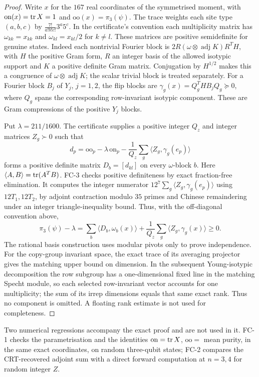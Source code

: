 \begin{proof}
Write $x$ for the $167$ real coordinates of the symmetrised moment, with
$\mathrm{on}(x)=\operatorname{tr} X=1$ and $\mathrm{oo}(x)=\pi_3(\psi)$.
The trace weights each site type $(a,b,c)$ by $\frac{7!}{a!b!c!}3^a5^c$.
In the certificate's convention each multiplicity matrix has
$\omega_{kk}=x_{kk}$ and $\omega_{kl}=x_{kl}/2$ for $k\ne l$.
These matrices are positive semidefinite for genuine states. Indeed each nontrivial
Fourier block is
$2R(\omega\otimes\operatorname{adj}K)R^TH$, with $H$ the positive Gram form,
$R$ an integer basis of the allowed isotypic support and $K$ a positive definite Gram matrix.
Conjugation by $H^{1/2}$ makes this a congruence of
$\omega\otimes\operatorname{adj}K$; the scalar trivial block is treated separately.
For a Fourier block $B_j$ of $Y_j$, $j=1,2$, the flip blocks are
$\gamma_g(x)=Q_g^THB_jQ_g\succeq0$, where $Q_g$ spans the corresponding
row-invariant isotypic component. These are Gram compressions of the positive $Y_j$ blocks.

Put $\lambda=211/1600$. The certificate supplies a positive integer $Q_z$ and
integer matrices $Z_g\succ0$ such that
\[
 d_p=\mathrm{oo}_p-\lambda\,\mathrm{on}_p
       -\frac1{Q_z}\sum_g\langle Z_g,\gamma_g(e_p)\rangle
\]
forms a positive definite matrix $D_b=[d_{kl}]$ on every $\omega$-block $b$.
Here $\langle A,B\rangle=\operatorname{tr}(A^TB)$. FC-3 checks positive definiteness by exact
fraction-free elimination. It computes the integer numerator
$12^7\sum_g\langle Z_g,\gamma_g(e_p)\rangle$ using $12T_1,12T_2$,
by adjoint contraction modulo $35$ primes and Chinese remaindering under an integer
triangle-inequality bound. Thus, with the off-diagonal convention above,
\[
 \pi_3(\psi)-\lambda
 =\sum_b\langle D_b,\omega_b(x)\rangle
   +\frac1{Q_z}\sum_g\langle Z_g,\gamma_g(x)\rangle\ge0.
\]
The rational basis construction uses modular pivots only to prove independence.
For the copy-group invariant space, the exact trace of its averaging projector
gives the matching upper bound on dimension. In the subsequent Young-isotypic
decomposition the row subgroup has a one-dimensional fixed line in the matching Specht module,
so each selected row-invariant vector accounts for one multiplicity;
the sum of its irrep dimensions equals that same exact rank. Thus no component
is omitted. A floating rank estimate is not used for completeness. \qedhere
\end{proof}

\begin{remark}
Two numerical regressions accompany the exact proof and are not used in it. FC-1 checks the parametrisation and
the identities $\mathrm{on}=\operatorname{tr} X$, $\mathrm{oo}=$ mean purity, in the same exact coordinates, on random
three-qubit states; FC-2 compares the CRT-recovered adjoint sum with a direct forward computation at $n=3,4$ for random integer $Z$.
\end{remark}

